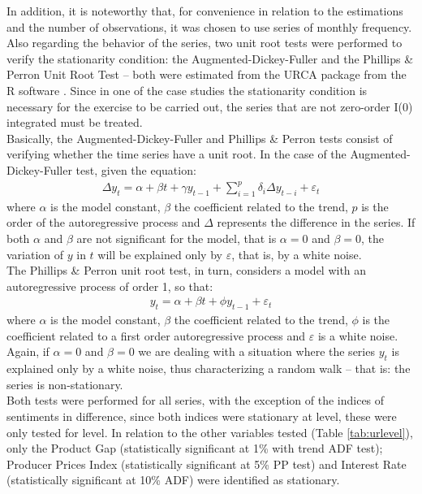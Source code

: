 In addition, it is noteworthy that, for convenience in relation to the estimations and the number of observations, it was chosen to use series of monthly frequency.\\

Also regarding the behavior of the series, two unit root tests were performed to verify the stationarity condition: the Augmented-Dickey-Fuller \cite[]{cheung1995lag} and the Phillips \& Perron Unit Root Test \cite[]{phillips1988testing} -- both were estimated from the URCA package \cite[]{urcacran} from the R software \cite[]{rcran}. Since in one of the case studies the stationarity condition is necessary for the exercise to be carried out, the series that are not zero-order I(0) integrated must be treated.\\

Basically, the Augmented-Dickey-Fuller and Phillips \& Perron tests consist of verifying whether the time series have a unit root. In the case of the Augmented-Dickey-Fuller test, given the equation:
\begin{align}
    \Delta y_t = \alpha + \beta t + \gamma y_{t-1} + \sum_{i=1}^{p} \delta_i \Delta y_{t-i} + \varepsilon_t
\end{align}
where $\alpha$ is the model constant, $\beta$ the coefficient related to the trend, $p$ is the order of the autoregressive process and $\Delta$ represents the difference in the series. If both $\alpha$ and $\beta$ are not significant for the model, that is $\alpha = 0$ and $\beta = 0$, the variation of $y$ in $t$ will be explained only by $\varepsilon$, that is, by a white noise.\\

The Phillips \& Perron unit root test, in turn, considers a model with an autoregressive process of order 1, so that:
\begin{align}
    y_t = \alpha + \beta t + \phi y_{t-1} + \varepsilon_t
\end{align}
where $\alpha$ is the model constant, $\beta$ the coefficient related to the trend, $\phi$ is the coefficient related to a first order autoregressive process and $\varepsilon$ is a white noise. Again, if $\alpha=0$ and $\beta = 0$ we are dealing with a situation where the series $y_t$ is explained only by a white noise, thus characterizing a random walk -- that is: the series is non-stationary. \\

Both tests were performed for all series, with the exception of the indices of sentiments in difference, since both indices were stationary at level, these were only tested for level. In relation to the other variables tested (Table {\ref{tab:urlevel}}), only the Product Gap (statistically significant at 1\% with trend ADF test); Producer Prices Index (statistically significant at 5\% PP test) and Interest Rate (statistically significant
at 10\% ADF) were identified as stationary. 


